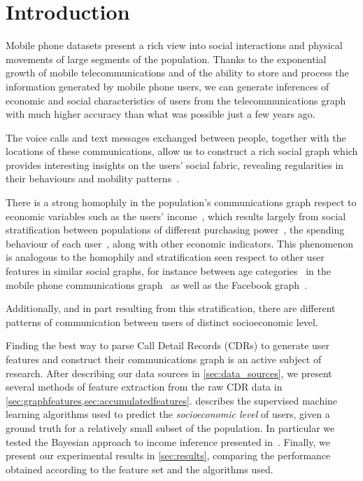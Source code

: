 
\section{Introduction}

Mobile phone datasets present a rich view into social interactions and physical movements of large segments of the population. Thanks to the exponential growth of mobile telecommunications and of the ability to store and process the information generated by mobile phone users, we can generate inferences of economic and social characteristics of users from the telecommunications graph with much higher accuracy than what was possible just a few years ago.

The voice calls and text messages exchanged between people, together with the locations of these communications, allow us to construct a rich social graph which provides interesting insights on the users' social fabric, revealing regularities in their behaviours and mobility patterns~\cite{gonzalez2008understanding,ponieman2013human,sarraute2015city}.

There is a strong homophily in the population's communications graph respect to economic variables such as the users' income~\cite{fixmanasonam2016}, which results largely from social stratification between populations of different purchasing power~\cite{leo2015socioeconomic}, the spending behaviour of each user~\cite{singh2013predicting}, along with other economic indicators.
This phenomenon is analogous to the homophily and stratification seen respect to other user features in similar social graphs, for instance between age categories~\cite{mcpherson2001birds} in the mobile phone communications graph~\cite{sarraute2014} as well as the Facebook graph~\cite{ugander2011anatomy}.

Additionally, and in part resulting from this stratification, there are different patterns of communication between users of distinct socioeconomic level.

Finding the best way to parse Call Detail Records (CDRs) to generate user features and construct their communications graph is an active subject of research.  After describing our data sources in \cref{sec:data_sources}, we present several methods of feature extraction from the raw CDR data in \cref{sec:graphfeatures,sec:accumulatedfeatures}.  describes the supervised machine learning algorithms used to predict the \emph{socioeconomic level} of users, given a ground truth for a relatively small subset of the population. In particular we tested the Bayesian approach to income inference presented in~\cite{fixmanasonam2016}. Finally, we present our experimental results in \cref{sec:results}, comparing the performance obtained according to the feature set and the algorithms used.
